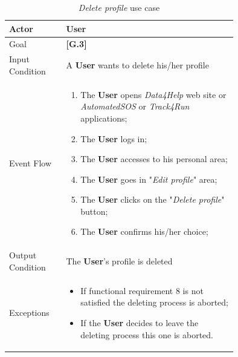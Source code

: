 \begin{center}
\begin{table}
\begin{tabular}{ | l | p{0.75\linewidth} | }
  \hline
    Actor & \textbf{User} \\ \hline
    Goal & \textbf{[G.3]} \\ \hline
    Input Condition & A \textbf{User} wants to delete his/her profile\\ \hline
    Event Flow & \begin{minipage}[t]{0.7\textwidth}
      \begin{enumerate}
        \item The \textbf{User} opens \textit{Data4Help} web site or \textit{AutomatedSOS} or \textit{Track4Run} applications;
        \item The \textbf{User} logs in;
        \item The \textbf{User} accesses to his personal area;
        \item The \textbf{User} goes in "\textit{Edit profile}" area;
        \item The \textbf{User} clicks on the "\textit{Delete profile}" button;
        \item The \textbf{User} confirms his/her choice;
      \end{enumerate}
    \smallskip
  \end{minipage} \\ \hline
  Output Condition & The \textbf{User}'s  profile is deleted\\ \hline
  Exceptions & \begin{minipage}[t]{0.7\textwidth}
    \begin{itemize}
      \smallskip
      \item If functional requirement 8 is not satisfied the deleting process is aborted;
      \item If the \textbf{User} decides to leave the deleting process this one is aborted.
    \end{itemize}
    \smallskip
  \end{minipage}  \\ \hline
\end{tabular}
\caption{\textit{Delete profile} use case}
\label{table:deleteProfileTable}
\end{table}
\end{center}

